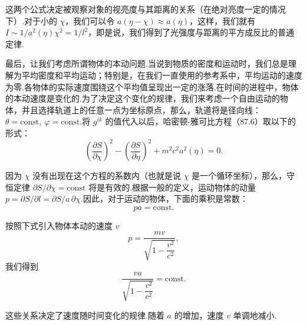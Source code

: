 这两个公式决定被观察对象的视亮度与其距离的关系（在绝对亮度一定的情况下）.对于小的 $\chi$，我们可以令 $a(\eta-\chi)\approx a(\eta)$，这样，我们就有 $I\sim1/a^{2}(\eta)\chi^{2}=1/l^{2}$，即是说，我们得到了光强度与距离的平方成反比的普通定律.

最后，让我们考虑所谓物体的本动问题.当说到物质的密度和运动时，我们总是理解为平均密度和平均运动；特别是，在我们一直使用的参考系中，平均运动的速度为零.各物体的实际速度围绕这个平均值呈现出一定的涨落.在时间的进程中，物体的本动速度是变化的.为了决定这个变化的规律，我们来考虑一个自由运动的物体，并且选择轨道上的任意一点为坐标原点，那么，轨道将是径向线：$\theta=\mathrm{const},\ \varphi=\mathrm{const}$.将 $g^{ik}$ 的值代入以后，哈密顿-雅可比方程（87.6）取以下的形式：
\begin{equation}
  \left(\frac{\partial S}{\partial\chi}\right)^{2}
  -\left(\frac{\partial S}{\partial\eta}\right)^{2}
  +m^{2}c^{2}a^{2}(\eta)=0.
\end{equation}

因为 $\chi$ 没有出现在这个方程的系数内（也就是说 $\chi$ 是一个循环坐标），那么，守恒定律 $\partial S/\partial\chi=\mathrm{const}$ 将是有效的.根据一般的定义，运动物体的动量 $p=\partial S/\partial l=\partial S/a\,\partial\chi$.因此，对于运动的物体，下面的乘积是常数：
\begin{equation}
  pa=\mathrm{const}.
\end{equation}

按照下式引入物体本动的速度 $v$
\begin{equation*}
  p=\frac{mv}{\sqrt{1-\dfrac{v^{2}}{c^{2}}}},
\end{equation*}
我们得到
\begin{equation}
  \frac{va}{\sqrt{1-\dfrac{v^{2}}{c^{2}}}}=\mathrm{const}.
\end{equation}

这些关系决定了速度随时间变化的规律.随着 $a$ 的增加，速度 $v$ 单调地减小.


